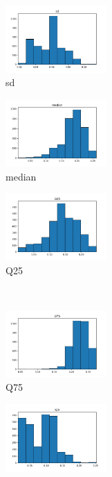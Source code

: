 \documentclass[a4paper]{article}
\begin{document}
\begin{figure}
    \centering
    \begin{subfigure}{0.32\textwidth}
        \centering
        \includegraphics[width=3.85cm]{raw_0_sd}
        \caption{sd}
        \label{fig:sub_raw_1}
    \end{subfigure}
    \hfill
    \begin{subfigure}{0.32\textwidth}
        \centering
        \includegraphics[width=3.85cm]{raw_1_median}
        \caption{median}
        \label{fig:sub_raw_2}
    \end{subfigure}
    \hfill
    \begin{subfigure}{0.32\textwidth}
        \centering
        \includegraphics[width=3.85cm]{raw_2_Q25}
        \caption{Q25}
        \label{fig:sub_raw_3}
    \end{subfigure}%
    \\
    \begin{subfigure}{0.32\textwidth}
        \centering
        \includegraphics[width=3.85cm]{raw_3_Q75}
        \caption{Q75}
        \label{fig:sub_raw_4}
    \end{subfigure}\hfill
    \begin{subfigure}{0.32\textwidth}
        \centering
        \includegraphics[width=3.85cm]{raw_4_IQR}

\end{subfigure}
\end{figure}
\end{document}
